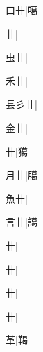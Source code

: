 \begin{multicols}{2}
{{\cjk{}{\cnsym{}　}口卄}|{\cjk{}噶}\par
{卄}|{}\par
{\cjk{}{\cnsym{}　}虫卄}|{}\par
{\cjk{}{\cnsym{}　}禾卄}|{}\par
{\cjk{}镸彡卄}|{}\par
{\cjk{}{\cnsym{}　}金卄}|{}\par
{卄}|{\cjk{}獦}\par
{\cjk{}{\cnsym{}　}月卄}|{\cjk{}臈}\par
{\cjk{}{\cnsym{}　}魚卄}|{}\par
{\cjk{}{\cnsym{}　}言卄}|{\cjk{}譪}\par
{卄}|{}\par
{卄}|{}\par
{卄}|{}\par
{卄}|{}\par
{\cjk{}{\cnsym{}　}{\cnsym{}　}革}|{\cjk{}鞨}\par
}
\end{multicols}

